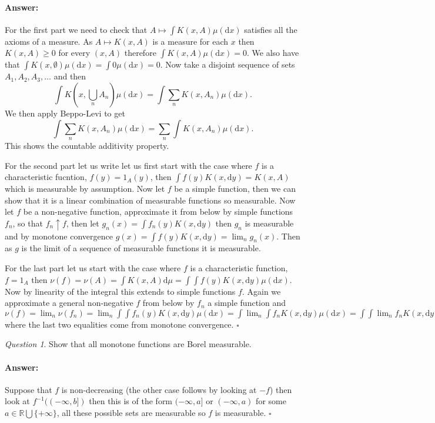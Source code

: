 \documentclass[11pt]{article}
\theoremstyle{definition}
\theoremstyle{remark}
\newtheorem{q}{Question}
\newenvironment{ans}{\paragraph{Answer:}}{\hfill$\square$\vspace{10pt}}
\begin{document}
\begin{ans}
For the first part we need to check that $A \mapsto \int K(x,A) \mu(\mathrm{d}x)$ satisfies all the axioms of a measure. As $A \mapsto K(x,A)$ is a measure for each $x$ then $K(x,A) \geq 0$ for every $(x,A)$ therefore $\int K(x,A) \mu(\mathrm{d}x) = 0$. We also have that $\int K(x, \emptyset) \mu(\mathrm{d}x) = \int 0 \mu(\mathrm{d}x) =0$. Now take a disjoint sequence of sets $A_1, A_2, A_3, \dots$ and then 
\[ \int K(x, \bigcup_n A_n) \mu(\mathrm{d}x) = \int \sum_n K(x, A_n) \mu(\mathrm{d}x). \] We then apply Beppo-Levi to get
\[ \int \sum_n K(x,A_n) \mu(\mathrm{d}x) = \sum_n \int K(x,A_n) \mu(\mathrm{d}x). \] This shows the countable additivity property.

For the second part let us write let us first start with the case where $f$ is a characteristic fucntion, $f(y) = 1_A(y)$, then $\int f(y) K(x, \mathrm{d}y) = K(x,A)$ which is measurable by assumption. Now let $f$ be a simple function, then we can show that it is a linear combination of measurable functions so measurable. Now let $f$ be a non-negative function, approximate it from below by simple functions $f_n$, so that $f_n \uparrow f$, then let $g_n(x) = \int f_n(y) K(x, \mathrm{d}y)$ then $g_n$ is measurable and by monotone convergence $g(x) = \int f(y) K(x, \mathrm{d}y) = \lim_n g_n(x)$. Then as $g$ is the limit of a sequence of measurable functions it is measurable.

For the last part let us start with the case where $f$ is a characteristic function, $f=1_A$ then $\nu(f) = \nu(A) = \int K(x,A) \mathrm{d}\mu = \int \int f(y) K(x,\mathrm{d}y)\mu(\mathrm{d}x)$. Now by linearity of the integral this extends to simple functions $f$. Again we approximate a general non-negative $f$ from below by $f_n$ a simple function and $\nu(f) = \lim_n \nu(f_n) = \lim_n \int \int f_n(y) K(x, \mathrm{d}y) \mu(\mathrm{d}x) = \int \lim_n \int f_n K(x,\mathrm{d}y) \mu(\mathrm{d}x) = \int \int \lim_n f_n K(x,\mathrm{d}y) \mu(\mathrm{d}x)$ where the last two equalities come from monotone convergence.
\end{ans}

\begin{q}
Show that all monotone functions are Borel measurable.
\end{q}
\begin{ans}
Suppose that $f$ is non-decreasing (the other case follows by looking at $-f$) then look at $f^{-1}((-\infty, b])$ then this is of the form $(-\infty, a]$ or $(-\infty, a)$ for some $a \in \mathbb{R}\bigcup \{+\infty\}$, all these possible sets are measurable so $f$ is measurable.
\end{ans}
\end{document}
